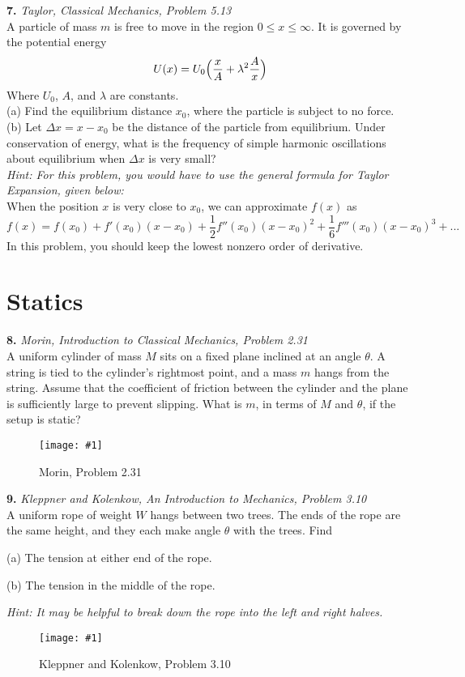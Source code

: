 \documentclass[11pt]{article}
\newcommand{\fig}[4]{
    \begin{figure}[H]
        \centering
        \texttt{[image: \#1]}
        \caption{#2}
        \label{exp4fit}
    \end{figure}
}
\theoremstyle{gangnamstyle}{\newtheorem{definition}{Definition}[]}
\theoremstyle{gangnamstyle}{\newtheorem{example}{Example}[]}
\theoremstyle{gangnamstyle}{\newtheorem{problem}{Problem}[]}
\begin{document}
\pagebreak

\textbf{7.} \textit{Taylor, Classical Mechanics, Problem 5.13} \\
A particle of mass $m$ is free to move in the region $0 \leq x \leq \infty$. It is governed by the potential energy
\[ U(x) = U_0\Bigl(\frac{x}{A} + \lambda^2\frac{A}{x}\Bigr) \]
Where $U_0$, $A$, and $\lambda$ are constants. \\
(a) Find the equilibrium distance $x_0$, where the particle is subject to no force. \\
(b) Let $\Delta x = x - x_0$ be the distance of the particle from equilibrium. Under conservation of energy, what is the frequency of simple harmonic oscillations about equilibrium when $\Delta x$ is very small? \\

\textit{Hint: For this problem, you would have to use the general formula for Taylor Expansion, given below:} \\
When the position $x$ is very close to $x_0$, we can approximate $f(x)$ as
\[ f(x) = f(x_0) + f'(x_0)(x - x_0) + \frac{1}{2} f''(x_0)(x - x_0)^2 + \frac{1}{6}f'''(x_0)(x - x_0)^3 + ... \]
In this problem, you should keep the lowest nonzero order of derivative. 

\pagebreak

\section{Statics}

\textbf{8.} \textit{Morin, Introduction to Classical Mechanics, Problem 2.31} \\
A uniform cylinder of mass $M$ sits on a fixed plane inclined at an angle $\theta$. A string is tied to the cylinder’s rightmost point, and a mass $m$ hangs from the string. Assume that the coefficient of friction between the cylinder and the plane is sufficiently large to prevent slipping. What is $m$, in terms of $M$ and $\theta$, if the setup is static?

\fig{figs/0729/m231.png}{Morin, Problem 2.31}{0.6}{0}

\pagebreak

\textbf{9.} \textit{Kleppner and Kolenkow, An Introduction to Mechanics, Problem 3.10} \\
A uniform rope of weight $W$ hangs between two trees. The ends of the rope are the same height, and they each make angle $\theta$ with the trees. Find

(a) The tension at either end of the rope.

(b) The tension in the middle of the rope.

\textit{Hint: It may be helpful to break down the rope into the left and right halves. }

\fig{figs/0729/kk310.png}{Kleppner and Kolenkow, Problem 3.10}{0.4}{0}

\pagebreak
\end{document}
